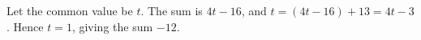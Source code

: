 Let the common value be $t$. The sum is $4t-16$, and $t=(4t-16)+13=4t-3$. Hence $t=1$, giving the sum $\boxed{-12}$.
